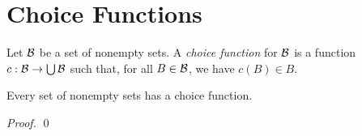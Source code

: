 \section{Choice Functions}

\begin{definition}
    Let $\mathcal{B}$ be a set of nonempty sets. A \emph{choice function} for $\mathcal{B}$ is a function $c : \mathcal{B} \rightarrow \bigcup \mathcal{B}$ such that, for all $B \in \mathcal{B}$,
    we have $c(B) \in B$.
\end{definition}

\begin{lemma}
    \label{lemma:choice_function}
    Every set of nonempty sets has a choice function.
\end{lemma}

\begin{proof}
    \pf
    \qed
\end{proof}